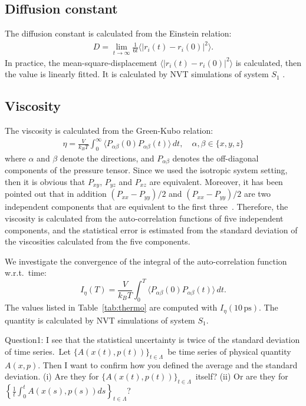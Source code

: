 \documentclass[a4paper,preprint,unsortedaddress,onecolumn,fleqn]{revtex4}
\begin{document}
\subsection{Diffusion constant}

The diffusion constant is calculated from the Einstein relation: 
\begin{align}
D = \lim_{t\rightarrow \infty}\frac {1}{6t} \langle \vert \mathbf{\mathit{r}}%
_i(t) - \mathbf{\mathit{r}}_i(0)\vert^2\rangle.
\end{align}
In practice, the mean-square-displacement $\langle\vert \mathbf{\mathit{r}}%
_i(t) - \mathbf{\mathit{r}}_i(0)\vert^2\rangle$ is calculated, then the
value is linearly fitted. It is calculated by NVT simulations of system $S_1$%
.

\subsection{Viscosity}

The viscosity is calculated from the Green-Kubo relation: 
\begin{align}
\eta = \frac{V}{k_BT}\int_0^\infty\langle P_{\alpha\beta}(0)
P_{\alpha\beta}(t)\rangle\,dt, \quad \alpha,\beta \in \{x, y, z\}
\end{align}
where $\alpha$ and $\beta$ denote the directions, and $P_{\alpha\beta}$
denotes the off-diagonal components of the pressure tensor. Since we used
the isotropic system setting, then it is obvious that $P_{xy}$, $P_{yz}$ and 
$P_{xz}$ are equivalent. Moreover, it has been pointed out that in addition $%
(P_{xx} - P_{yy})/2$ and $(P_{xx} - P_{yy})/2$ are two independent
components that are equivalent to the first three~\cite{alfe1998first}.
Therefore, the viscosity is calculated from the auto-correlation functions
of five independent components, and the statistical error is estimated from
the standard deviation of the viscosities calculated from the five
components.

We investigate the convergence of the integral of the auto-correlation
function w.r.t.~time: 
\begin{equation*}
I_{\eta }(T)=\frac{V}{k_{B}T}\int_{0}^{T}\langle P_{\alpha \beta
}(0)P_{\alpha \beta }(t)\rangle \,dt.
\end{equation*}%
The values listed in Table~\ref{tab:thermo} are computed with $I_{\eta }(10\,%
\text{ps})$. The quantity is calculated by NVT simulations of system $S_{1}$.

\newpage

{\color{blue} Question1: I see that the statistical uncertainty is twice of
the standard deviation of time series.\ Let $\{A(x(t),p(t))\}_{t\in \Lambda }
${\ be time series of physical quantity }$A(x,p)${. Then I want to confirm
how you defined the average and the standard deviation. (i) Are they for }$%
\{A(x(t),p(t))\}_{t\in \Lambda }${\ itself? (ii) }Or are they {for }$\left\{ 
\frac{1}{t}\int_{0}^{t}A(x(s),p(s))ds\right\} _{t\in \Lambda }${? }}
\end{document}
